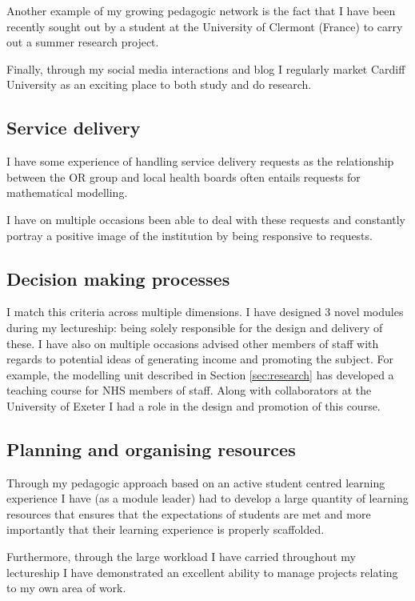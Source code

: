 \documentclass{article}
\begin{document}
Another example of my growing pedagogic network is the fact that I have been recently sought out by a student at the University of Clermont (France) to carry out a summer research project.

Finally, through my social media interactions and blog I regularly market Cardiff University as an exciting place to both study and do research.

\subsection{Service delivery}

I have some experience of handling service delivery requests as the relationship between the OR group and local health boards often entails requests for mathematical modelling.

I have on multiple occasions been able to deal with these requests and constantly portray a positive image of the institution by being responsive to requests.

\subsection{Decision making processes}

I match this criteria across multiple dimensions.
I have designed 3 novel modules during my lectureship: being solely responsible for the design and delivery of these.
I have also on multiple occasions advised other members of staff with regards to potential ideas of generating income and promoting the subject. For example, the modelling unit described in Section \ref{sec:research} has developed a teaching course for NHS members of staff.
Along with collaborators at the University of Exeter I had a role in the design and promotion of this course.

\subsection{Planning and organising resources}

Through my pedagogic approach based on an active student centred learning experience I have (as a module leader) had to develop a large quantity of learning resources that ensures that the expectations of students are met and more importantly that their learning experience is properly scaffolded.

Furthermore, through the large workload I have carried throughout my lectureship I have demonstrated an excellent ability to manage projects relating to my own area of work.
\end{document}
